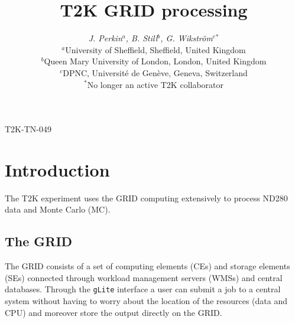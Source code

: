 \documentclass[11pt]{article}
\date{}
\begin{document}
\title{\bf{T2K GRID processing}}

\author{{\slshape J. Perkin$^a$, B. Still$^b$, G. Wikstr\"{o}m$^c$$^*$}\\[1ex]
$^a$University of Sheffield, Sheffield, United Kingdom\\
$^b$Queen Mary University of London, London, United Kingdom\\
$^c$DPNC, Universit\'{e} de Gen\`{e}ve, Geneva, Switzerland\\
$^*$No longer an active T2K collaborator}

\maketitle



\vspace{10cm} 
T2K-TN-049

\thispagestyle{empty}

\newpage

\tableofcontents

\newpage

\section{Introduction}
\label{sec:intro}

The T2K experiment uses the GRID computing extensively to process
ND280 data and Monte Carlo (MC). 

\subsection{The GRID}
The GRID consists of a set of computing elements (CEs) and storage
elements (SEs) connected through workload management servers (WMSs)
and central databases. Through the \verb+gLite+ interface a user can
submit a job to a central system without having to worry about the
location of the resources (data and CPU) and moreover store the output
directly on the GRID.
\end{document}
